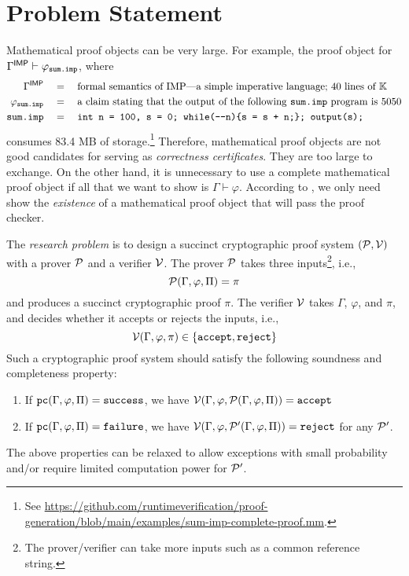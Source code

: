 \documentclass{article}
\begin{document}
\section{Problem Statement}
\label{sec:crypto_proofs}

Mathematical proof objects can be very large.
For example, the proof object for
$\Gamma^{\mathsf{IMP}} \vdash \varphi_{\textnormal{\texttt{sum.imp}}}$,
where
\begin{align}
\GammaIMP &\quad=\quad 
\text{formal semantics of IMP---a simple imperative language; 40 lines of \K}
\\
\varphisum &\quad=\quad 
\text{a claim stating that the output of the following \cdsum program is 5050}
\\
\cdsum &\quad=\quad 
\code{int n = 100, s = 0; while(-{}-n)\{s = s + n;\}; output(s);}
\end{align}
consumes 83.4 MB of storage.\footnote{See \url{https://github.com/runtimeverification/proof-generation/blob/main/examples/sum-imp-complete-proof.mm}.}
Therefore, mathematical proof objects are not good candidates for
serving as \emph{correctness certificates}.
They are too large to exchange. 
On the other hand, 
it is unnecessary to use a complete mathematical proof object
if all that we want to show is $\Gamma \vdash \varphi$.
According to ,
we only need show the \emph{existence} of a mathematical proof object
that will pass the proof checker. 

The \emph{research problem} is to 
design a succinct cryptographic proof system
$(\mathcal{P},\mathcal{V})$
with a prover $\mathcal{P}$ and a verifier $\mathcal{V}$.
The prover $\mathcal{P}$ takes three inputs\footnote{The prover/verifier can take more inputs such as a common reference string.}, i.e., 
\begin{equation}
\mathcal{P}(\Gamma, \varphi, \Pi) = \pi
\end{equation}
and produces a succinct cryptographic proof $\pi$. 
The verifier $\mathcal{V}$ takes $\Gamma$, $\varphi$, and $\pi$,
and decides whether it accepts or rejects the inputs, i.e.,
\begin{equation}
\mathcal{V}(\Gamma, \varphi, \pi) \in \{\textnormal{\texttt{accept}}, \textnormal{\texttt{reject}}\}
\end{equation}
Such a cryptographic proof system should satisfy the following soundness and completeness property:
\begin{enumerate}
\item If $\textnormal{\texttt{pc}}(\Gamma,\varphi,\Pi) = \textnormal{\texttt{success}}$, we have $\mathcal{V}(\Gamma,\varphi,\mathcal{P}(\Gamma, \varphi, \Pi)) = \textnormal{\texttt{accept}}$
\item If $\textnormal{\texttt{pc}}(\Gamma,\varphi,\Pi) = \textnormal{\texttt{failure}}$, we have
$\mathcal{V}(\Gamma, \varphi, \mathcal{P}'(\Gamma, \varphi, \Pi)) = \textnormal{\texttt{reject}}$
for any $\mathcal{P}'$. 
\end{enumerate}
The above properties can be relaxed to allow exceptions with small probability
and/or require limited computation power for $\mathcal{P}'$. 
\end{document}
